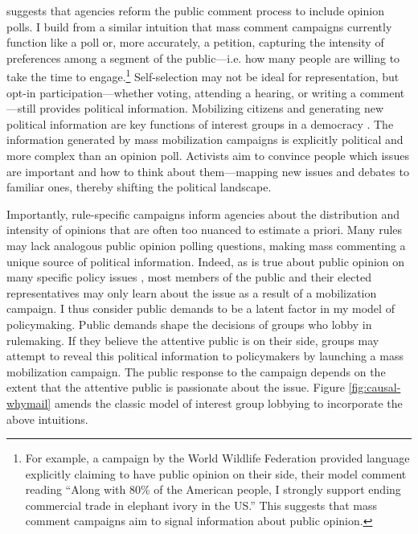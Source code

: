 \citet{Rauch2016} suggests that agencies reform the public comment process to include opinion polls. I build from a similar intuition that mass comment campaigns currently function like a poll or, more accurately, a petition, capturing the intensity of preferences among a segment of the public---i.e. how many people are willing to take the time to engage.\footnote{
For example, %
a campaign by the World Wildlife Federation provided language explicitly claiming to have public opinion on their side, their model comment reading ``Along with 80\% of the American people, I strongly support ending commercial trade in elephant ivory in the US.'' This suggests that mass comment campaigns aim to signal information about public opinion.
} 
Self-selection may not be ideal for representation, but opt-in participation---whether voting, attending a hearing, or writing a comment---still provides political information. 
Mobilizing citizens and generating new political information are key functions of interest groups in a democracy \citep{Mansbridge1992, Mahoney2007}. The information generated by mass mobilization campaigns is explicitly political and more complex than an opinion poll. Activists aim to convince people which issues are important and how to think about them---mapping new issues and debates to familiar ones, thereby shifting the political landscape. 

Importantly, rule-specific campaigns inform agencies about the distribution and intensity of opinions that are often too nuanced to estimate a priori. Many rules may lack analogous public opinion polling questions, making mass commenting a unique source of political information. Indeed, as is true about public opinion on many specific policy issues \citep{Hutchings2003},  most members of the public and their elected representatives may only learn about the issue as a result of a mobilization campaign. I thus consider public demands to be a latent factor in my model of policymaking. Public demands shape the decisions of groups who lobby in rulemaking. If they believe the attentive public is on their side, groups may attempt to reveal this political information to policymakers by launching a mass mobilization campaign. The public response to the campaign depends on the extent that the attentive public is passionate about the issue.%
Figure \ref{fig:causal-whymail} amends the classic model of interest group lobbying to incorporate the above intuitions.


